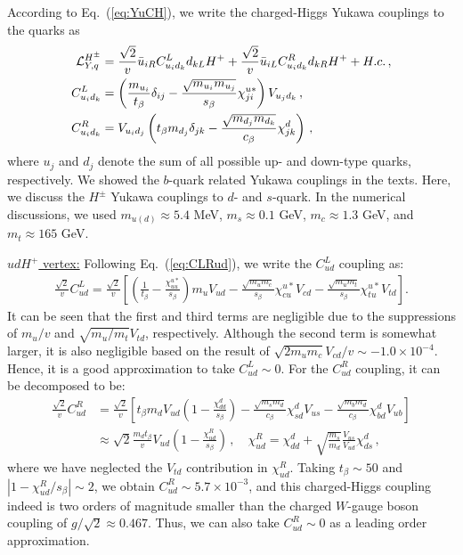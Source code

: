 \documentclass[prd,preprint,superscriptaddress,amsmath,amssymb]{revtex4}
\begin{document}
 According to Eq.~(\ref{eq:YuCH}), we write the charged-Higgs Yukawa couplings to the quarks as
  \begin{align}
 {\cal L}^{H^\pm}_{Y,q} & = \frac{\sqrt{2}}{v}  \bar u_{i R} C^L_{u_i d_k} d_{kL} H^+ +   \frac{\sqrt{2}}{v}  \bar u_{i L} C^R_{u_i d_k} d_{k R} H^+ + H.c.\,, \nonumber \\
 C^L_{u_i d_k} & =  \left(  \frac{m_{u_i}}{ t_\beta }  \delta_{ij} - \frac{\sqrt{m_{u_i} m_{u_j}}}{ s_\beta}  \chi^{u*}_{ji} \right) V_{u_j d_k} \,, \nonumber \\
C^R_{u_i d_k} &= V_{u_i d_j} \left( t_\beta  m_{d_j}  \delta_{j k} - \frac{\sqrt{m_{d_j} m_{d_k}}}{  c_\beta} \chi^d_{jk}\right)\,, \label{eq:CLRud}
 \end{align}
where $u_j$ and $d_j$ denote the sum of all possible up- and down-type quarks, respectively. We showed the $b$-quark related Yukawa couplings in the texts. Here, we discuss the $H^\pm$ Yukawa couplings to $d$- and $s$-quark. In the numerical discussions, we used $m_{u(d)}\approx 5.4$ MeV, $m_s\approx 0.1$ GeV, $m_c\approx 1.3$ GeV, and $m_t\approx 165$ GeV. 
 
  \underline {$ ud H^+$ vertex:}  Following Eq.~(\ref{eq:CLRud}), we write the $C^L_{ud}$ coupling as:
 \begin{align}
 \frac{\sqrt{2}}{v} C^{L}_{ud} = \frac{\sqrt{2}}{v} \left[ \left(\frac{1}{t_\beta} -\frac{\chi^{u*}_{uu}}{s_\beta} \right) m_u V_{ud} - \frac{\sqrt{m_u m_c}}{s_\beta} \chi^{u*}_{cu} V_{cd} - \frac{\sqrt{m_u m_t}}{s_\beta} \chi^{u*}_{tu} V_{td}\right].
 \end{align}
 It can be seen that the first and third terms are negligible due to the suppressions of $m_u/v$ and $\sqrt{m_u/m_t} V_{td}$, respectively. Although the second term is somewhat larger, it is also negligible based on the result of $\sqrt{2 m_u m_c} V_{cd}/v \sim -1.0 \times 10^{-4}$.  Hence, it is a good approximation to take $C^L_{ud} \sim 0$.  For the $C^R_{ud}$ coupling, it can be decomposed to be:
  \begin{align}
 \frac{\sqrt{2}}{v} C^{R}_{ud} &= \frac{\sqrt{2}}{v} \left[ t_\beta m_d V_{ud} \left( 1 -\frac{\chi^{d}_{dd}}{s_\beta} \right)  - \frac{\sqrt{m_s m_d}}{c_\beta} \chi^{d}_{sd} V_{us} - \frac{\sqrt{m_b m_d}}{c_\beta} \chi^{d}_{bd} V_{ub}\right] \nonumber \\
 & \approx \sqrt{2} \frac{m_d t_\beta}{v} V_{ud} \left( 1 - \frac{\chi^R_{ud} }{s_\beta} \right)\,, \quad \chi^R_{ud} = \chi^d_{dd} + \sqrt{\frac{m_s}{m_d}} \frac{V_{us}}{V_{ud}} \chi^d_{ds}\,,
 \end{align}
 where we have neglected the $V_{td}$ contribution in $\chi^R_{ud}$. 
Taking $t_\beta\sim 50$ and $|1-\chi^R_{ud}/s_\beta|\sim 2$, we obtain $C^R_{ud} \sim  5.7\times 10^{-3}$, and this charged-Higgs coupling indeed is two orders of  magnitude smaller than  the charged $W$-gauge boson coupling of $g/\sqrt{2} \approx 0.467$. Thus, we can also take $C^R_{ud} \sim 0$ as a leading order approximation. 
 
\end{document}
